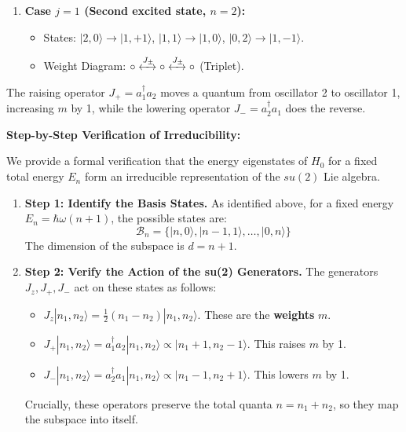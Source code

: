 \begin{solution}
\begin{remark}
\begin{enumerate}
    \item \textbf{Case $j=1$ (Second excited state, $n=2$):}
    \begin{itemize}
        \item States: 
        $|2, 0\rangle \to |1, +1\rangle$, 
        $|1, 1\rangle \to |1, 0\rangle$, 
        $|0, 2\rangle \to |1, -1\rangle$.
        \item Weight Diagram: $\circ \xleftrightarrow{J_\pm} \circ \xleftrightarrow{J_\pm} \circ$ (Triplet).
    \end{itemize}
\end{enumerate}
The raising operator $J_+ = a_1^\dagger a_2$ moves a quantum from oscillator 2 to oscillator 1, increasing $m$ by 1, while the lowering operator $J_- = a_2^\dagger a_1$ does the reverse.
\end{remark}

\textbf{Step-by-Step Verification of Irreducibility:}

We provide a formal verification that the energy eigenstates of $H_0$ for a fixed total energy $E_n$ form an irreducible representation of the $su(2)$ Lie algebra.

\begin{enumerate}
    \item \textbf{Step 1: Identify the Basis States.}
    As identified above, for a fixed energy $E_n = \hbar\omega(n+1)$, the possible states are:
    \[ \mathcal{B}_n = \{ |n, 0\rangle, |n-1, 1\rangle, \dots, |0, n\rangle \} \]
    The dimension of the subspace is $d = n+1$.

    \item \textbf{Step 2: Verify the Action of the su(2) Generators.}
    The generators $J_z, J_+, J_-$ act on these states as follows:
    \begin{itemize}
        \item $J_z |n_1, n_2\rangle = \frac{1}{2}(n_1 - n_2) |n_1, n_2\rangle$. These are the \textbf{weights} $m$.
        \item $J_+ |n_1, n_2\rangle = a_1^\dagger a_2 |n_1, n_2\rangle \propto |n_1+1, n_2-1\rangle$. This raises $m$ by 1.
        \item $J_- |n_1, n_2\rangle = a_2^\dagger a_1 |n_1, n_2\rangle \propto |n_1-1, n_2+1\rangle$. This lowers $m$ by 1.
    \end{itemize}
    Crucially, these operators preserve the total quanta $n = n_1 + n_2$, so they map the subspace into itself.


\end{enumerate}
\end{solution}
